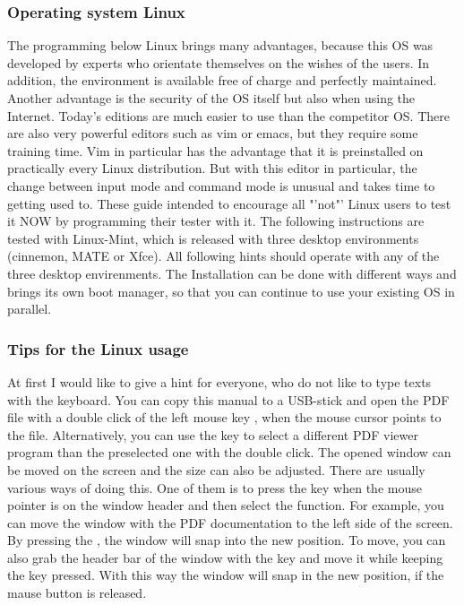 \subsubsection{Operating system Linux}

The programming below Linux brings many advantages, because this OS was developed by experts
who orientate themselves on the wishes of the users.
In addition, the environment is available free of charge and perfectly maintained.
Another advantage is the security of the OS itself but also when using the Internet.
Today's editions are much easier to use than the competitor OS.
There are also very powerful editors such as vim or emacs, but they require some training time.
Vim in particular has the advantage that it is preinstalled on practically every Linux distribution.
But with this editor in particular, the change between input mode and command mode
is unusual and takes time to getting used to.
These guide intended to encourage all "'not"' Linux users to test it NOW
by programming their tester with it.
The following instructions are tested with Linux-Mint, which is released with
three desktop environments (cinnemon, MATE or Xfce).
All following hints should operate with any of the three desktop envirenments.
The Installation can be done with different ways and brings its own boot manager,
so that you can continue to use your existing OS in parallel. 

\subsubsection{Tips for the Linux usage}

At first I would like to give a hint for everyone, who do not like to
type texts with the keyboard.
You can copy this manual to a USB-stick and open the PDF file with a double click
of the left mouse key \LMB,
when the mouse cursor points to the file.
Alternatively, you can use the \RMB key to select a different PDF viewer program
than the preselected one with the double click.
The opened window can be moved on the screen and the size can also be adjusted.
There are usually various ways of doing this.
One of them is to press the \RMB key when the mouse pointer is on the window header and
then select the  function.
For example, you can move the window with the PDF documentation to the left side of the screen.
By pressing the \LMB, the window will snap into the new position. 
To move, you can also grab the header bar of the window with the \LMB key and move it
while keeping the \LMB key pressed.
With this way the window will snap in the new position, if the mause button is released.

